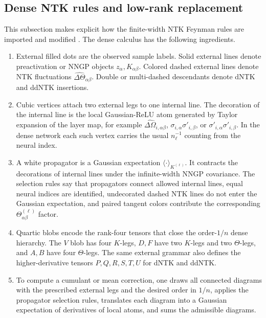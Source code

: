 \documentclass{article}
\begin{document}
\subsection{Dense NTK rules and low-rank replacement}
\label{app:misof-rule-comparison}
This subsection makes explicit how the finite-width NTK Feynman rules are imported and modified \citep{FeynmanNTK2025}. The dense calculus has the following ingredients.
\begin{enumerate}[leftmargin=1.5em]
\item External filled dots are the observed sample labels. Solid external lines denote preactivation or NNGP objects \(z_\alpha,K_{\alpha\beta}\). Colored dashed external lines denote NTK fluctuations \(\widehat{\Delta\Theta}_{\alpha\beta}\). Double or multi-dashed descendants denote dNTK and ddNTK insertions.
\item Cubic vertices attach two external legs to one internal line. The decoration of the internal line is the local Gaussian-ReLU atom generated by Taylor expansion of the layer map, for example \(\widehat{\Delta\Omega}_{i,\alpha\beta}\), \(\sigma_{i,\alpha}\sigma'_{i,\beta}\), or \(\sigma'_{i,\alpha}\sigma'_{i,\beta}\). In the dense network each such vertex carries the usual \(n_\ell^{-1}\) counting from the neural index.
\item A white propagator is a Gaussian expectation \(\langle\cdot\rangle_{K^{(\ell)}}\). It contracts the decorations of internal lines under the infinite-width NNGP covariance. The selection rules say that propagators connect allowed internal lines, equal neural indices are identified, undecorated dashed NTK lines do not enter the Gaussian expectation, and paired tangent colors contribute the corresponding \(\Theta_{\alpha\beta}^{(\ell)}\) factor.
\item Quartic blobs encode the rank-four tensors that close the order-\(1/n\) dense hierarchy. The \(V\) blob has four \(K\)-legs, \(D,F\) have two \(K\)-legs and two \(\Theta\)-legs, and \(A,B\) have four \(\Theta\)-legs. The same external grammar also defines the higher-derivative tensors \(P,Q,R,S,T,U\) for dNTK and ddNTK.
\item To compute a cumulant or mean correction, one draws all connected diagrams with the prescribed external legs and the desired order in \(1/n\), applies the propagator selection rules, translates each diagram into a Gaussian expectation of derivatives of local atoms, and sums the admissible diagrams.
\end{enumerate}
\end{document}
